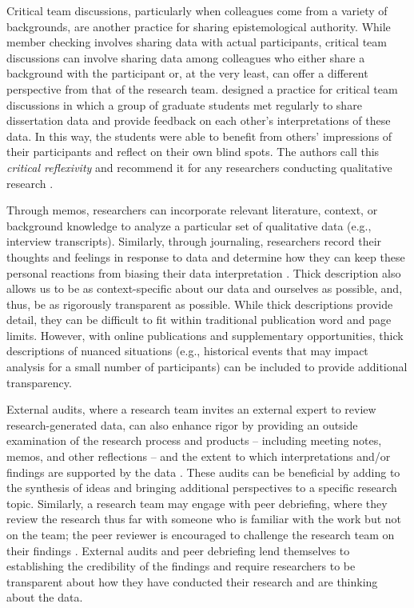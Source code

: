 \documentclass[authordate, meta, issue]{jote-new-article}
\begin{document}
Critical team discussions, particularly when colleagues come from a variety of backgrounds, are another practice for sharing epistemological authority. While member checking involves sharing data with actual participants, critical team discussions can involve sharing data among colleagues who either share a background with the participant or, at the very least, can offer a different perspective from that of the research team. \parencites{Mao2016} designed a practice for critical team discussions in which a group of graduate students met regularly to share dissertation data and provide feedback on each other’s interpretations of these data. In this way, the students were able to benefit from others’ impressions of their participants and reflect on their own blind spots. The authors call this \emph{critical reflexivity} and recommend it for any researchers conducting qualitative research \parencites[e.g.,][]{Fook2007}{Mao2016}.



Through memos, researchers can incorporate relevant literature, context, or background knowledge to analyze a particular set of qualitative data (e.g., interview transcripts). Similarly, through journaling, researchers record their thoughts and feelings in response to data and determine how they can keep these personal reactions from biasing their data interpretation \parencites{Meyer2019}. Thick description \parencites{Geertz1973} also allows us to be as context-specific about our data and ourselves as possible, and, thus, be as rigorously transparent as possible. While thick descriptions provide detail, they can be difficult to fit within traditional publication word and page limits. However, with online publications and supplementary opportunities, thick descriptions of nuanced situations (e.g., historical events that may impact analysis for a small number of participants) can be included to provide additional transparency.



External audits, where a research team invites an external expert to review research-generated data, can also enhance rigor by providing an outside examination of the research process and products – including meeting notes, memos, and other reflections – and the extent to which interpretations and/or findings are supported by the data \parencites{Creswell2000}{Lincoln1986}{Rodgers1993}{Wolf2003}. These audits can be beneficial by adding to the synthesis of ideas and bringing additional perspectives to a specific research topic. Similarly, a research team may engage with peer debriefing, where they review the research thus far with someone who is familiar with the work but not on the team; the peer reviewer is encouraged to challenge the research team on their findings \parencites{Creswell2000}. External audits and peer debriefing lend themselves to establishing the credibility of the findings and require researchers to be transparent about how they have conducted their research and are thinking about the data.
\end{document}
